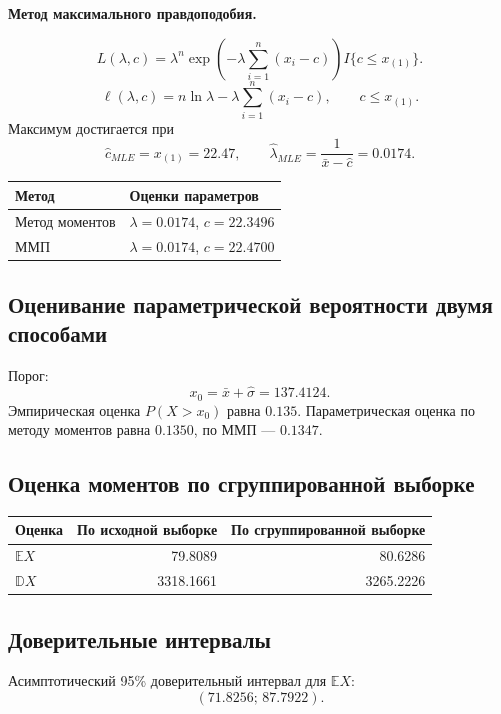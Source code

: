 \documentclass[12pt,a4paper]{article}
\begin{document}
\textbf{Метод максимального правдоподобия.}

\[
L(\lambda, c) = \lambda^n \exp\left(-\lambda \sum_{i=1}^{n}(x_i-c)\right) I\{c \le x_{(1)}\}.
\]
\[
\ell(\lambda,c) = n\ln\lambda - \lambda \sum_{i=1}^{n}(x_i-c), \qquad c \le x_{(1)}.
\]
Максимум достигается при
\[
\hat{c}_{MLE} = x_{(1)} = 22.47, \qquad \hat{\lambda}_{MLE} = \frac{1}{\bar{x} - \hat{c}} = 0.0174.
\]

\begin{center}
\begin{tabular}{>{\raggedright\arraybackslash}p{}p{}}
\toprule
Метод & Оценки параметров \\
\midrule
Метод моментов & $\lambda = 0.0174$, $c = 22.3496$ \\
ММП & $\lambda = 0.0174$, $c = 22.4700$ \\
\bottomrule
\end{tabular}
\end{center}

\subsection{Оценивание параметрической вероятности двумя способами}

Порог:
\[
x_0 = \bar{x} + \hat{\sigma} = 137.4124.
\]
Эмпирическая оценка $P(X > x_0)$ равна $0.135$. Параметрическая оценка по методу моментов равна $0.1350$, по ММП --- $0.1347$.

\subsection{Оценка моментов по сгруппированной выборке}

\begin{center}
\begin{tabular}{lrr}
\toprule
Оценка & По исходной выборке & По сгруппированной выборке \\
\midrule
$\mathbb{E}X$ & 79.8089 & 80.6286 \\
$\mathbb{D}X$ & 3318.1661 & 3265.2226 \\
\bottomrule
\end{tabular}
\end{center}

\subsection{Доверительные интервалы}

Асимптотический 95\% доверительный интервал для $\mathbb{E}X$:
\[
(71.8256;\, 87.7922).
\]
\end{document}
